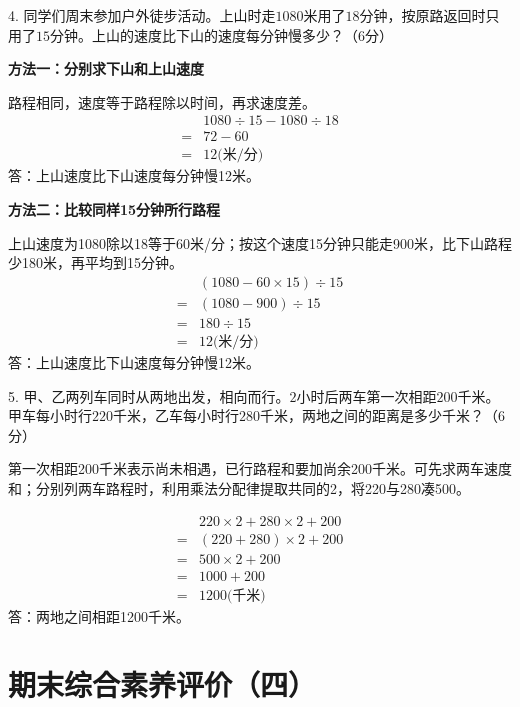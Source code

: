 4. 同学们周末参加户外徒步活动。上山时走\(1080\)米用了\(18\)分钟，按原路返回时只用了\(15\)分钟。上山的速度比下山的速度每分钟慢多少？（6分）\par
\begin{BookAnswer}
\textbf{方法一：分别求下山和上山速度}\par 路程相同，速度等于路程除以时间，再求速度差。\[\begin{aligned} &1080\div15-1080\div18\\ ={}&72-60\\ ={}&12\text{(米/分)}\end{aligned}\]答：上山速度比下山速度每分钟慢12米。\par \textbf{方法二：比较同样15分钟所行路程}\par 上山速度为1080除以18等于60米/分；按这个速度15分钟只能走900米，比下山路程少180米，再平均到15分钟。\[\begin{aligned} &(1080-60\times15)\div15\\ ={}&(1080-900)\div15\\ ={}&180\div15\\ ={}&12\text{(米/分)}\end{aligned}\]答：上山速度比下山速度每分钟慢12米。\par
\end{BookAnswer}

5. 甲、乙两列车同时从两地出发，相向而行。\(2\)小时后两车第一次相距\(200\)千米。甲车每小时行\(220\)千米，乙车每小时行\(280\)千米，两地之间的距离是多少千米？（6分）\par
\begin{BookAnswer}
第一次相距200千米表示尚未相遇，已行路程和要加尚余200千米。可先求两车速度和；分别列两车路程时，利用乘法分配律提取共同的2，将220与280凑500。\par \[\begin{aligned}&220\times2+280\times2+200\\={}&(220+280)\times2+200\\={}&500\times2+200\\={}&1000+200\\={}&1200\text{(千米)}\end{aligned}\]答：两地之间相距1200千米。
\end{BookAnswer}


\section{期末综合素养评价（四）}

